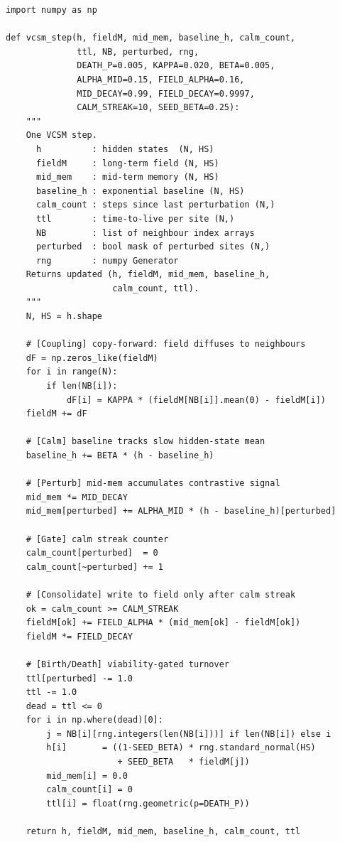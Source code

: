 \documentclass[12pt]{article}
\begin{document}
\begin{lstlisting}[caption={Core VCSM update step (Python, numpy only). One call per simulation step. All parameters defined in Section~\ref{sec:proposal}.}, label=lst:vcsm]
import numpy as np

def vcsm_step(h, fieldM, mid_mem, baseline_h, calm_count,
              ttl, NB, perturbed, rng,
              DEATH_P=0.005, KAPPA=0.020, BETA=0.005,
              ALPHA_MID=0.15, FIELD_ALPHA=0.16,
              MID_DECAY=0.99, FIELD_DECAY=0.9997,
              CALM_STREAK=10, SEED_BETA=0.25):
    """
    One VCSM step.
      h          : hidden states  (N, HS)
      fieldM     : long-term field (N, HS)
      mid_mem    : mid-term memory (N, HS)
      baseline_h : exponential baseline (N, HS)
      calm_count : steps since last perturbation (N,)
      ttl        : time-to-live per site (N,)
      NB         : list of neighbour index arrays
      perturbed  : bool mask of perturbed sites (N,)
      rng        : numpy Generator
    Returns updated (h, fieldM, mid_mem, baseline_h,
                     calm_count, ttl).
    """
    N, HS = h.shape

    # [Coupling] copy-forward: field diffuses to neighbours
    dF = np.zeros_like(fieldM)
    for i in range(N):
        if len(NB[i]):
            dF[i] = KAPPA * (fieldM[NB[i]].mean(0) - fieldM[i])
    fieldM += dF

    # [Calm] baseline tracks slow hidden-state mean
    baseline_h += BETA * (h - baseline_h)

    # [Perturb] mid-mem accumulates contrastive signal
    mid_mem *= MID_DECAY
    mid_mem[perturbed] += ALPHA_MID * (h - baseline_h)[perturbed]

    # [Gate] calm streak counter
    calm_count[perturbed]  = 0
    calm_count[~perturbed] += 1

    # [Consolidate] write to field only after calm streak
    ok = calm_count >= CALM_STREAK
    fieldM[ok] += FIELD_ALPHA * (mid_mem[ok] - fieldM[ok])
    fieldM *= FIELD_DECAY

    # [Birth/Death] viability-gated turnover
    ttl[perturbed] -= 1.0
    ttl -= 1.0
    dead = ttl <= 0
    for i in np.where(dead)[0]:
        j = NB[i][rng.integers(len(NB[i]))] if len(NB[i]) else i
        h[i]       = ((1-SEED_BETA) * rng.standard_normal(HS)
                      + SEED_BETA   * fieldM[j])
        mid_mem[i] = 0.0
        calm_count[i] = 0
        ttl[i] = float(rng.geometric(p=DEATH_P))

    return h, fieldM, mid_mem, baseline_h, calm_count, ttl
\end{lstlisting}
\end{document}

